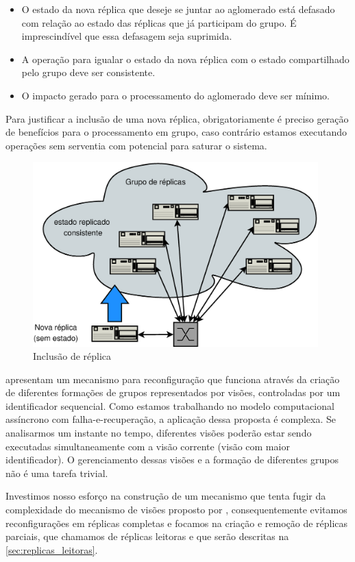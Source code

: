 \begin{itemize}
  \item O estado da nova réplica que deseje se juntar ao aglomerado está defasado com
    relação ao estado das réplicas que já participam do grupo. É imprescindível que essa
    defasagem seja suprimida.
  \item A operação para igualar o estado da nova réplica com o estado compartilhado pelo
    grupo deve ser consistente.
  \item O impacto gerado para o processamento do aglomerado deve ser mínimo.
\end{itemize}

Para justificar a inclusão de uma nova réplica, obrigatoriamente é preciso geração de
benefícios para o processamento em grupo, caso contrário estamos executando operações sem
serventia com potencial para saturar o sistema.

\begin{figure}[ht]
  \centering
  \includegraphics[width=11cm]{conteudo/capitulos/figuras/inclusao_replica_cluster.eps}
  \caption{Inclusão de réplica}
  \label{fig:inclusao}
\end{figure}

 apresentam um mecanismo para reconfiguração que funciona através da
criação de diferentes formações de grupos representados por visões, controladas por um
identificador sequencial. Como estamos trabalhando no modelo computacional assíncrono com
falha-e-recuperação, a aplicação dessa proposta é complexa. Se analisarmos um instante no
tempo, diferentes visões poderão estar sendo executadas simultaneamente com a visão
corrente (visão com maior identificador). O gerenciamento dessas visões e a formação de
diferentes grupos não é uma tarefa trivial.

Investimos nosso esforço na construção de um mecanismo que tenta fugir da complexidade do
mecanismo de visões proposto por , consequentemente evitamos
reconfigurações em réplicas completas e focamos na criação e remoção de réplicas parciais,
que chamamos de réplicas leitoras e que serão descritas na \autoref{sec:replicas_leitoras}.

